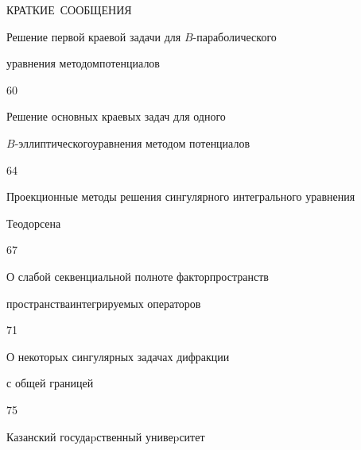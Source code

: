 \bigskip


\par


\centerline{КРАТКИЕ~СООБЩЕНИЯ}


\bigskip







{Решение первой краевой задачи для $B$-параболического 


уравнения методом\newline потенциалов}{60}




{Решение основных краевых задач для одного


$B$-эллиптического\newline уравнения методом потенциалов}{64}




{Проекционные методы решения сингулярного интегрального уравнения \newline


Теодорсена}{67}




{О слабой секвенциальной полноте факторпространств


пространства\newline интегрируемых операторов}{71}




{О некоторых сингулярных задачах дифракции 


с общей границей}{75}











\vfill


\noindent\raisebox{2pt}{\copyright} Казанский госудаpственный унивеpситет





